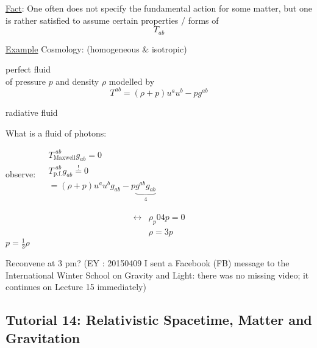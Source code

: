 \underline{Fact}: One often does not specify the fundamental action for some matter, but one is rather satisfied to assume certain properties / forms of 
\[
T_{ab}
\]

\underline{Example} Cosmology: (homogeneous \& isotropic)

perfect fluid \\

of pressure $p$ and density $\rho$
modelled by
\[
T^{ab} = (\rho + p)u^a u^b - pg^{ab}
\]

radiative fluid

What is a fluid of photons:

observe: $\begin{aligned}
  & T_{\text{Maxwell}}^{ \, \, ab} g_{ab} = 0 \\ 
  & T_{\text{p.f.}}^{ \, \, ab} g_{ab} \overset{!}{=} 0 \\
& = (\rho + p)u^a u^b g_{ab} - p\underbrace{ g^{ab} g_{ab} }_{ 4}
\end{aligned}$

\[
\begin{aligned}
 \leftrightarrow & \rho _ p 04p = 0 \\ 
 & \rho = 3p
\end{aligned}
\]
$p=\frac{1}{3}\rho$

Reconvene at 3 pm?  (EY : 20150409 I sent a Facebook (FB) message to the International Winter School on Gravity and Light: there was no missing video; it continues on Lecture 15 immediately)

\subsection*{Tutorial 14: Relativistic Spacetime, Matter and Gravitation}







